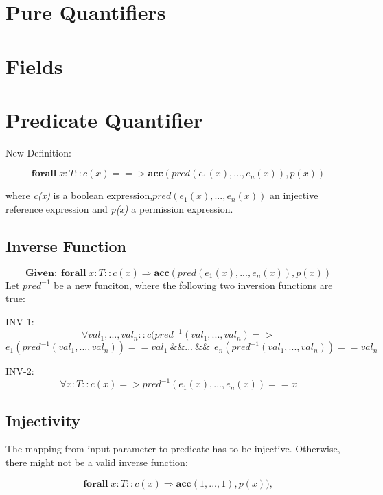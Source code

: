 \documentclass[12pt]{article}
\begin{document}
\maketitle
\section{Pure Quantifiers}
\section{Fields}
\section{Predicate Quantifier}
New Definition:

\begin{equation}
	\mathbf{forall} \; x:T :: c(x) ==>\mathbf{acc}( pred(e_1(x), ... ,e_n(x)), p(x) )
\end{equation}

where {\it c(x)} is  a boolean expression,$pred(e_1(x), ... ,e_n(x))$ an injective reference expression and {\it p(x)} a permission expression.

\subsection{Inverse Function}

\[ \mathbf{Given: \; } \mathbf{forall} \; x:T :: c(x) \Rightarrow \mathbf{acc}( pred(e_1(x), ... ,e_n(x)), p(x) )   \]
Let  $pred^{- 1}$ be a new funciton, where the following two inversion functions are true:

INV-1:
\[ \forall val_1, ..., val_n :: c(pred^{-1} (val_1, ..., val_n) => \]
\[ e_1 (pred^{-1} (val_1, ..., val_n)) == val_1 \: \&\&  ... \: \&\&  \:\: e_n(pred^{-1} (val_1, ..., val_n)) == val_n\]


INV-2:
\[ \forall x:T :: c(x) => pred^{-1}(e_1(x), ..., e_n(x)) == x\]

\subsection{Injectivity}
The mapping from input parameter to predicate has to be injective. Otherwise, there might not be a valid inverse function:


\begin{equation}
	\mathbf{forall} \; x:T :: c(x) \Rightarrow \mathbf{acc}( 1, ... ,1), p(x) ) ,
\end{equation}
\end{document}
